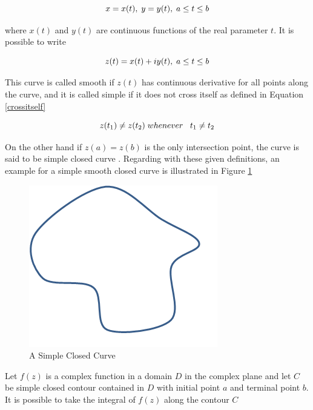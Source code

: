 \begin{equation}
x = x(t),   \hspace{0.1cm} y = y(t),  \hspace{0.1cm} a\leq t \leq b
\end{equation}

where $x(t)$ and $y(t)$ are continuous functions of the real parameter $t$.  It is possible to write
		
\begin{equation}
z(t) = x(t)+iy(t),   \hspace{0.1cm} a\leq t \leq b
\end{equation}
		
This curve is called smooth if $z(t)$ has continuous derivative for all points along the curve, and it is called simple if it does not cross itself as defined in Equation \ref{crossitself}

\begin{equation} \label{crossitself}
z(t_1) \neq z(t_2)   \hspace{0.1cm} whenever   \hspace{0.3cm} t_1\neq t_2
\end{equation}
		
On the other hand if  $z(a)=z(b)$ is the only intersection point, the curve is said to be simple closed curve \cite{wiki_contour}. Regarding with these given definitions, an example for a  simple smooth closed curve is illustrated in Figure \ref{simple_closed_curve_ref}

\begin{figure}[H]
\caption{A Simple Closed Curve} \label{simple_closed_curve_ref}
\centering
\includegraphics[scale = 0.60]{simple_closed_curve}
\end{figure}
		
Let $f(z)$ is a complex function in a domain $D$ in the complex plane and let $C$ be simple closed contour contained in $D$ with initial point $a$ and terminal point  $b$. It is possible to take the integral of $f(z)$ along the contour $C$ \cite{wiki_contour}
		

